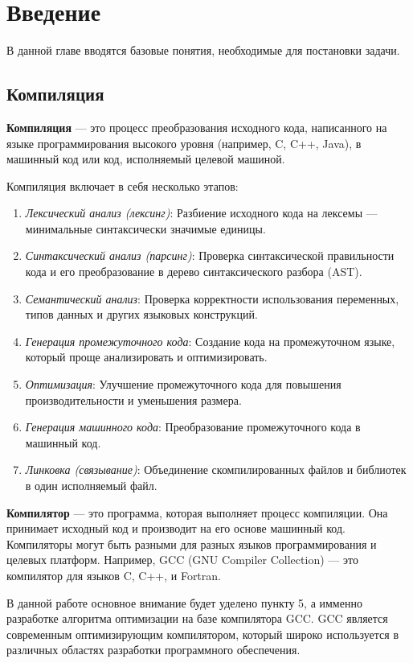 \section{Введение}
\label{sec:Chapter0} 

В данной главе вводятся базовые понятия, необходимые для постановки задачи.

\subsection{Компиляция}
\textbf{Компиляция} — это процесс преобразования исходного кода, написанного на языке программирования высокого уровня (например, C, C++, Java), в машинный код или код, исполняемый целевой машиной.

Компиляция включает в себя несколько этапов:
\begin{enumerate}
    \item \textit{Лексический анализ (лексинг)}: Разбиение исходного кода на лексемы — минимальные синтаксически значимые единицы.
    \item \textit{Синтаксический анализ (парсинг)}: Проверка синтаксической правильности кода и его преобразование в дерево синтаксического разбора (AST).
    \item \textit{Семантический анализ}: Проверка корректности использования переменных, типов данных и других языковых конструкций.
    \item \textit{Генерация промежуточного кода}: Создание кода на промежуточном языке, который проще анализировать и оптимизировать.
    \item \textit{Оптимизация}: Улучшение промежуточного кода для повышения производительности и уменьшения размера.
    \item \textit{Генерация машинного кода}: Преобразование промежуточного кода в машинный код.
    \item \textit{Линковка (связывание)}: Объединение скомпилированных файлов и библиотек в один исполняемый файл.
\end{enumerate}

\textbf{Компилятор} — это программа, которая выполняет процесс компиляции. Она принимает исходный код и производит на его основе машинный код. Компиляторы могут быть разными для разных языков программирования и целевых платформ. Например, GCC (GNU Compiler Collection) — это компилятор для языков C, C++, и Fortran. %

В данной работе основное внимание будет уделено пункту 5, а имменно разработке алгоритма оптимизации на базе компилятора GCC. GCC является современным оптимизирующим компилятором, который широко используется в различных областях разработки программного обеспечения.

